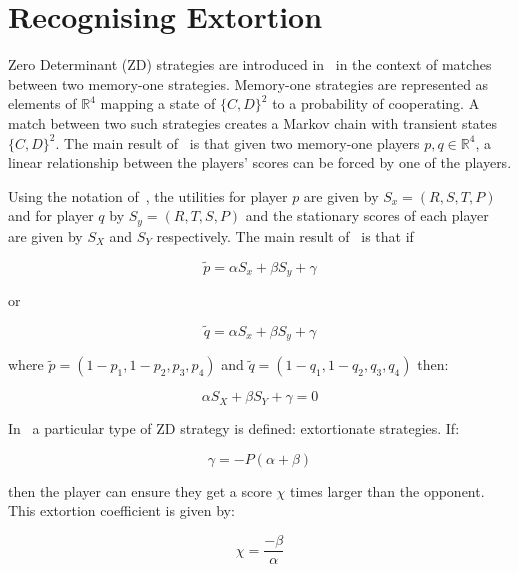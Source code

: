 \documentclass[a4paper]{article}
\begin{document}
\section{Recognising Extortion}\label{sec:sserror-zd-strategies}

Zero Determinant (ZD) strategies are introduced in~\cite{Press2012} in the
context of matches between two memory-one strategies. Memory-one strategies are
represented as elements of \(\mathbb{R}^4\) mapping a state of \({\{C, D\}}^2\)
to a probability of cooperating. A match between two such strategies creates a
Markov chain with transient states \({\{C, D\}}^2\). The main result
of~\cite{Press2012} is that given two memory-one players \(p,
q\in\mathbb{R}^4\), a linear relationship between the players' scores can be
forced by one of the players.

Using the notation of~\cite{Press2012}, the utilities for player \(p\)
are given by \(S_x=(R, S, T, P)\) and for player \(q\) by \(S_y=(R, T, S, P)\)
and the stationary scores of each player are given by \(S_X\) and \(S_Y\)
respectively. The main result of~\cite{Press2012} is that if

\begin{equation}\label{eqn:linear_relationship_for_p}
    \tilde p=\alpha S_x + \beta S_y + \gamma
\end{equation}

or

\begin{equation}\label{eqn:linear_relationship_for_q}
    \tilde q=\alpha S_x + \beta S_y + \gamma
\end{equation}

where \(\tilde p = (1 - p_1, 1 - p_2, p_3, p_4)\) and
\(\tilde q = (1 - q_1, 1 - q_2, q_3, q_4)\) then:

\begin{equation}
    \alpha S_X + \beta S_Y + \gamma = 0
\end{equation}

In~\cite{Press2012} a particular type of ZD strategy is defined: extortionate
strategies. If:

\begin{equation}\label{eqn:constraint_for_extortion}
    \gamma = - P(\alpha + \beta)
\end{equation}

then the player can ensure they get a score \(\chi\) times
larger than the opponent. This extortion coefficient is given by:

\begin{equation}\label{eqn:definition_of_chi}
    \chi=\frac{-\beta}{\alpha}
\end{equation}
\end{document}
